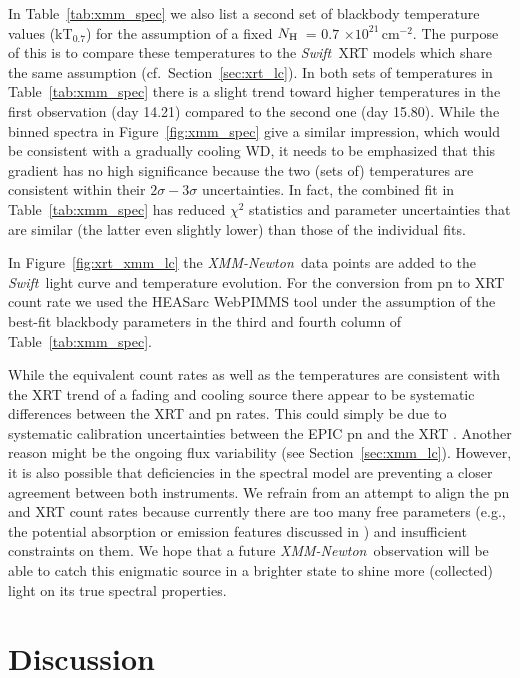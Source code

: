 \documentclass[twocolumn,tighten]{aastex6}
\def\swift{{\it Swift~}}
\def\xmm{{\it XMM-Newton~}}
\newcommand{\nh}{\hbox{$N_{\rm H}$}~}
\newcommand{\hcm}[1]{$\times 10^{#1}$\,cm$^{-2}$}
\newcommand{\othreek}{\citetalias{2016ApJ...833..149D}}
\begin{document}
In Table~\ref{tab:xmm_spec} we also list a second set of blackbody temperature values (kT$_{0.7}$) for the assumption of a fixed \nh = $0.7$ \hcm{21}. The purpose of this is to compare these temperatures to the \swift XRT models which share the same assumption (cf.\ Section~\ref{sec:xrt_lc}). In both sets of temperatures in Table~\ref{tab:xmm_spec} there is a slight trend toward higher temperatures in the first observation (day 14.21) compared to the second one (day 15.80). While the binned spectra in Figure~\ref{fig:xmm_spec} give a similar impression, which would be consistent with a gradually cooling WD, it needs to be emphasized that this gradient has no high significance because the two (sets of) temperatures are consistent within their $2\sigma-3\sigma$ uncertainties. In fact, the combined fit in Table~\ref{tab:xmm_spec} has reduced $\chi^2$ statistics and parameter uncertainties that are similar (the latter even slightly lower) than those of the individual fits.

In Figure~\ref{fig:xrt_xmm_lc} the \xmm data points are added to the \swift light curve and temperature evolution. For the conversion from pn to XRT count rate we used the HEASarc WebPIMMS tool \citep[based on PIMMS v4.8d,][]{1993Legac...3...21M} under the assumption of the best-fit blackbody parameters in the third and fourth column of Table~\ref{tab:xmm_spec}.

While the equivalent count rates as well as the temperatures are consistent with the XRT trend of a fading and cooling source there appear to be systematic differences between the XRT and pn rates. This could simply be due to systematic calibration uncertainties between the EPIC pn and the XRT \citep{2017AJ....153....2M}. Another reason might be the ongoing flux variability (see Section~\ref{sec:xmm_lc}). However, it is also possible that deficiencies in the spectral model are preventing a closer agreement between both instruments. We refrain from an attempt to align the pn and XRT count rates because currently there are too many free parameters (e.g., the potential absorption or emission features discussed in \othreek) and insufficient constraints on them. We hope that a future \xmm observation will be able to catch this enigmatic source in a brighter state to shine more (collected) light on its true spectral properties.

\section{Discussion}\label{sec:discussion}
\end{document}
